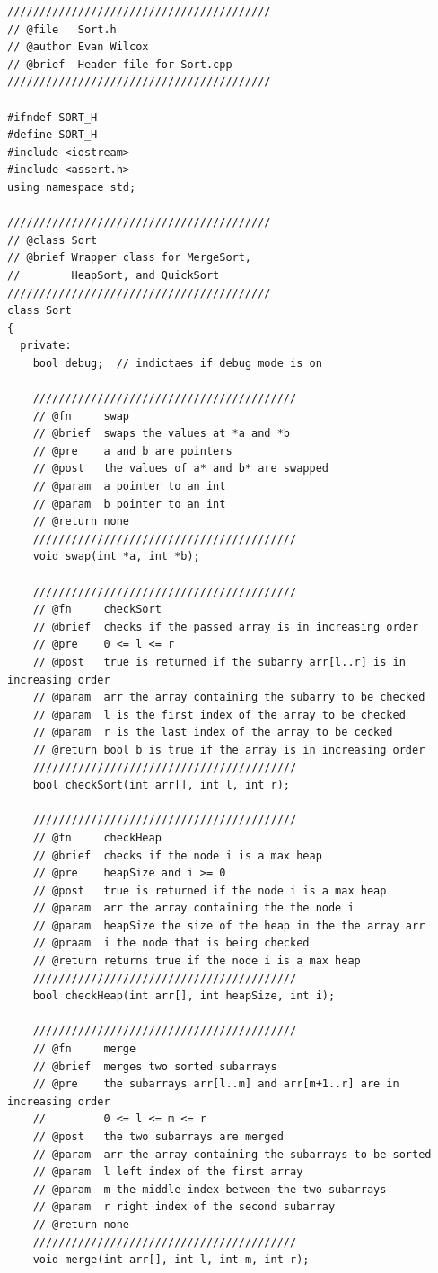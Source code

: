 \documentclass[a4paper]{article}
\begin{document}
    \begin{verbatim}
/////////////////////////////////////////
// @file   Sort.h
// @author Evan Wilcox
// @brief  Header file for Sort.cpp
/////////////////////////////////////////

#ifndef SORT_H
#define SORT_H
#include <iostream>
#include <assert.h>
using namespace std;

/////////////////////////////////////////
// @class Sort
// @brief Wrapper class for MergeSort, 
//        HeapSort, and QuickSort
/////////////////////////////////////////
class Sort
{
  private:
    bool debug;  // indictaes if debug mode is on

    /////////////////////////////////////////
    // @fn     swap
    // @brief  swaps the values at *a and *b
    // @pre    a and b are pointers
    // @post   the values of a* and b* are swapped
    // @param  a pointer to an int
    // @param  b pointer to an int
    // @return none
    /////////////////////////////////////////
    void swap(int *a, int *b);

    /////////////////////////////////////////
    // @fn     checkSort
    // @brief  checks if the passed array is in increasing order
    // @pre    0 <= l <= r
    // @post   true is returned if the subarry arr[l..r] is in increasing order
    // @param  arr the array containing the subarry to be checked
    // @param  l is the first index of the array to be checked
    // @param  r is the last index of the array to be cecked
    // @return bool b is true if the array is in increasing order
    /////////////////////////////////////////
    bool checkSort(int arr[], int l, int r);

    /////////////////////////////////////////
    // @fn     checkHeap
    // @brief  checks if the node i is a max heap
    // @pre    heapSize and i >= 0
    // @post   true is returned if the node i is a max heap
    // @param  arr the array containing the the node i
    // @param  heapSize the size of the heap in the the array arr
    // @praam  i the node that is being checked
    // @return returns true if the node i is a max heap
    /////////////////////////////////////////
    bool checkHeap(int arr[], int heapSize, int i);

    /////////////////////////////////////////
    // @fn     merge
    // @brief  merges two sorted subarrays
    // @pre    the subarrays arr[l..m] and arr[m+1..r] are in increasing order
    //         0 <= l <= m <= r
    // @post   the two subarrays are merged
    // @param  arr the array containing the subarrays to be sorted
    // @param  l left index of the first array
    // @param  m the middle index between the two subarrays
    // @param  r right index of the second subarray
    // @return none
    /////////////////////////////////////////
    void merge(int arr[], int l, int m, int r);


\end{verbatim}
\end{document}
